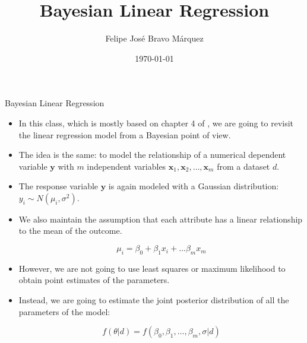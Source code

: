 \documentclass[handout]{beamer}
\title{Bayesian Linear Regression}
\author[Felipe Bravo Márquez]{\footnotesize
 \textcolor[rgb]{0.00,0.00,1.00}{Felipe José Bravo Márquez}}
\date{ \today }
\begin{document}
\begin{frame}
\titlepage


\end{frame}




\begin{frame}{Bayesian Linear Regression}
\scriptsize{
\begin{itemize}
\item In this class, which  is mostly based on chapter 4 of \cite{mcelreath2020statistical}, we are going to revisit the linear regression model from a Bayesian point of view.


\item The idea is the same: to model the relationship of a numerical dependent variable $\mathbf{y}$ with $m$ independent variables  $\mathbf{x}_1, \mathbf{x}_2, \dots, \mathbf{x}_m$ from a dataset $d$.

\item The response variable $\mathbf{y}$ is again modeled with a Gaussian distribution: $y_i \sim N(\mu_i,\sigma^2)$.


\item We also maintain the assumption that each attribute has a linear relationship to the mean of the outcome.

\begin{displaymath}
\mu_i = \beta_0 + \beta_1 x_i + \dots \beta_m x_m
\end{displaymath}

\item However, we are not going to use least squares or maximum likelihood to obtain point estimates of the parameters.

\item Instead, we are going to estimate the joint posterior distribution of all the parameters of the model:

\begin{displaymath}
f(\theta|d)= f(\beta_0,\beta_1,\dots,\beta_m,\sigma|d)
\end{displaymath}







 
\end{itemize}



} 

\end{frame}
\end{document}
